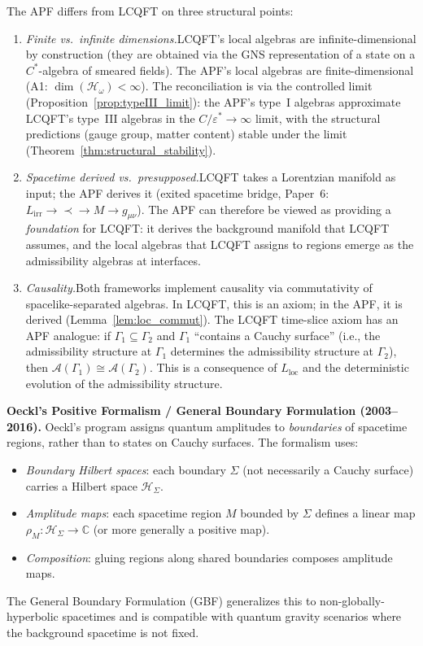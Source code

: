 \documentclass[11pt]{article}
\theoremstyle{definition}
\begin{document}
The APF differs from LCQFT on three structural points:
\begin{enumerate}[label=(\alph*),nosep]
  \item \textit{Finite vs.\ infinite dimensions.}\quad LCQFT's local
  algebras are infinite-dimensional by construction (they are obtained
  via the GNS representation of a state on a $C^*$-algebra of
  smeared fields).  The APF's local algebras are finite-dimensional
  (A1: $\dim(\mathcal{H}_\omega) < \infty$).  The reconciliation is
  via the controlled limit (Proposition~\ref{prop:typeIII_limit}):
  the APF's type~I algebras approximate LCQFT's type~III algebras
  in the $C/\varepsilon^* \to \infty$ limit, with the structural
  predictions (gauge group, matter content) stable under the limit
  (Theorem~\ref{thm:structural_stability}).
  \item \textit{Spacetime derived vs.\ presupposed.}\quad LCQFT takes
  a Lorentzian manifold as input; the APF derives it
  (exited spacetime bridge, Paper~6: $L_{\mathrm{irr}} \to \prec \to M \to
  g_{\mu\nu}$).  The APF can therefore be viewed as providing a
  \emph{foundation} for LCQFT: it derives the background manifold
  that LCQFT assumes, and the local algebras that LCQFT assigns to
  regions emerge as the admissibility algebras at interfaces.
  \item \textit{Causality.}\quad Both frameworks implement causality
  via commutativity of spacelike-separated algebras.  In LCQFT, this
  is an axiom; in the APF, it is derived
  (Lemma~\ref{lem:loc_commut}).  The LCQFT time-slice axiom has an
  APF analogue: if $\Gamma_1 \subseteq \Gamma_2$ and $\Gamma_1$
  ``contains a Cauchy surface'' (i.e., the admissibility structure at
  $\Gamma_1$ determines the admissibility structure at $\Gamma_2$),
  then $\mathcal{A}(\Gamma_1) \cong \mathcal{A}(\Gamma_2)$.  This
  is a consequence of $L_{\mathrm{loc}}$ and the deterministic
  evolution of the admissibility structure.
\end{enumerate}

\smallskip\noindent\textbf{Oeckl's Positive Formalism / General
Boundary Formulation (2003--2016).}\quad
Oeckl's program assigns quantum amplitudes to \emph{boundaries} of
spacetime regions, rather than to states on Cauchy surfaces.  The
formalism uses:
\begin{itemize}[nosep]
  \item \textit{Boundary Hilbert spaces}: each boundary $\Sigma$
  (not necessarily a Cauchy surface) carries a Hilbert space
  $\mathcal{H}_\Sigma$.
  \item \textit{Amplitude maps}: each spacetime region $M$ bounded by
  $\Sigma$ defines a linear map $\rho_M: \mathcal{H}_\Sigma \to
  \mathbb{C}$ (or more generally a positive map).
  \item \textit{Composition}: gluing regions along shared boundaries
  composes amplitude maps.
\end{itemize}
The General Boundary Formulation (GBF) generalizes this to
non-globally-hyperbolic spacetimes and is compatible with quantum
gravity scenarios where the background spacetime is not fixed.
\end{document}
